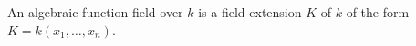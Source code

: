 An algebraic function field over $k$ is a field extension $K$ of $k$ of the form $K = k(x_1, \ldots, x_n)$.
